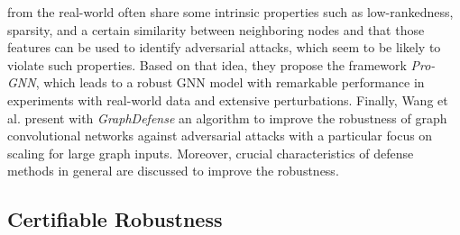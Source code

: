 \documentclass[a4paper,preprint]{sig-alternate}
\begin{document}
from the real-world often share some intrinsic properties such as low-rankedness, sparsity, and a certain similarity between neighboring
nodes and that those features can be used to identify adversarial attacks, which seem to be likely to violate such properties.
Based on that idea, they propose the framework \textit{Pro-GNN}, which leads to a robust GNN model with remarkable performance in experiments
with real-world data and extensive perturbations.
Finally, Wang et al. \cite{Wang_2019} present with \textit{GraphDefense} an algorithm to improve the robustness of graph convolutional 
networks against adversarial attacks with a particular focus on scaling for large graph inputs. 
Moreover, crucial characteristics of defense methods in general are discussed to improve the robustness.

\subsection{Certifiable Robustness}
\label{sec:rev3}
\end{document}
